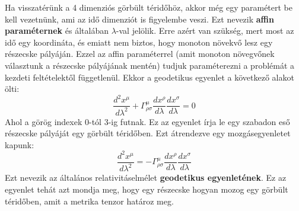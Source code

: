 \documentclass[../main.tex]{subfiles}
\begin{document}
Ha visszatérünk a 4 dimenziós görbült téridőhöz, akkor még egy paramétert be kell vezetnünk, ami az idő dimenziót is figyelembe veszi. Ezt nevezik \textbf{affin paraméternek} és általában
$\lambda$-val jelölik. Erre azért van szükség, mert most az idő egy koordináta, és emiatt nem biztos, hogy monoton növekvő lesz egy részecske pályáján.
Ezzel az affin paraméterrel (amit monoton növegvőnek választunk a részecske pályájának mentén) tudjuk paraméterezni a problémát a kezdeti feltételektől függetlenül. Ekkor a geodetikus egyenlet a következő alakot ölti:
\begin{equation}
    \frac{d^2 x^{\mu}}{d \lambda^2} + \Gamma^{\mu}_{\rho \sigma} \frac{d x^{\rho}}{d \lambda} \frac{d x^{\sigma}}{d \lambda} = 0
\end{equation}
Ahol a görög indexek 0-tól 3-ig futnak. Ez az egyenlet írja le egy szabadon eső részecske pályáját egy görbült téridőben. Ezt átrendezve egy mozgásegyenletet kapunk:
\begin{equation}
    \boxed{\frac{d^2 x^\mu}{d \lambda^2} = - \Gamma^{\mu}_{\rho \sigma} \frac{d x^{\rho}}{d \lambda} \frac{d x^{\sigma}}{d \lambda}}
\end{equation}
Ezt nevezik az általános relativitáselmélet \textbf{geodetikus egyenletének}. Ez az egyenlet tehát azt mondja meg, hogy egy részecske hogyan mozog egy görbült téridőben, amit a metrika tenzor határoz meg. 
\end{document}
